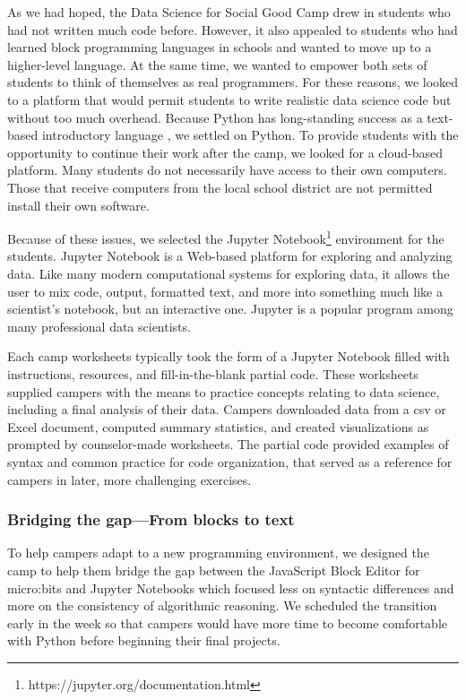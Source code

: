 As we had hoped, the Data Science for Social Good Camp drew in
students who had not written much code before.  However, it also
appealed to students who had learned block programming languages
in schools and wanted to move up to a higher-level language.  At
the same time, we wanted to empower both sets of students to think
of themselves as real programmers.  For these reasons, we looked
to a platform that would permit students to write realistic data
science code but without too much overhead.  Because Python has
long-standing success as a text-based introductory language
\cite{Guo2014}, we settled on Python.  To provide students with the
opportunity to continue their work after the camp, we looked for a
cloud-based platform.  Many students do not necessarily have access
to their own computers.  Those that receive computers from the local
school district are not permitted install their own software.

Because of these issues, we selected the Jupyter
Notebook\footnote{https://jupyter.org/documentation.html} environment
for the students.
Jupyter Notebook is a Web-based platform for exploring and analyzing
data.  Like many modern computational systems for exploring data, it
allows the user to mix code, output, formatted text, and more into
something much like a scientist's notebook, but an interactive one.
Jupyter is a popular program among many professional data scientists.

Each camp worksheets typically took the form of a Jupyter Notebook
filled with instructions, resources, and fill-in-the-blank partial
code.  These worksheets supplied campers with the means to practice
concepts relating to data science, including a final analysis of
their data.  Campers downloaded data from a csv or Excel document,
computed summary statistics, and created visualizations as prompted
by counselor-made worksheets. The partial code provided examples
of syntax and common practice for code organization, that served
as a reference for campers in later, more challenging exercises.

\subsubsection{Bridging the gap---From blocks to text}

To help campers adapt to a new programming environment, we designed
the camp to help them bridge the gap between the JavaScript Block
Editor for micro:bits and Jupyter Notebooks which focused less on
syntactic differences and more on the consistency of algorithmic
reasoning.  We scheduled the transition early in the week so that
campers would have more time to become comfortable with Python
before beginning their final projects.

